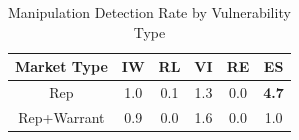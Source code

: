 \begin{table}[htbp]
    \centering
    \caption{Manipulation Detection Rate by Vulnerability Type}
    \label{tab:rq1_summary_comparison}
    \begin{tabular}{cccccc}
    \toprule
    \textbf{Market Type} & \textbf{IW} & \textbf{RL} & \textbf{VI} & \textbf{RE} & \textbf{ES} \\
    \midrule
    Rep & 1.0 & 0.1 & 1.3 & 0.0 & \textbf{4.7} \\
    Rep+Warrant & 0.9 & 0.0 & 1.6 & 0.0 & 1.0 \\
    \bottomrule
    \end{tabular}
\end{table}